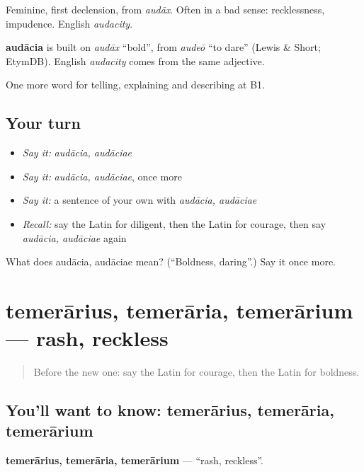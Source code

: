 Feminine, first declension, from \emph{audāx}. Often in a bad sense: recklessness, impudence. English \emph{audacity}.

\begin{cousinweb}
\textbf{audācia} is built on \emph{audāx} \textquotedblleft{}bold\textquotedblright{}, from \emph{audeō} \textquotedblleft{}to dare\textquotedblright{} (Lewis \& Short; EtymDB). English \emph{audacity} comes from the same adjective.
\end{cousinweb}

\begin{grammarlens}[title={What you've built}]
One more word for telling, explaining and describing at B1.
\end{grammarlens}

\subsection*{Your turn}
\begin{itemize}
\raggedright
  \item \emph{Say it:} \emph{audācia, audāciae}
  \item \emph{Say it:} \emph{audācia, audāciae}, once more
  \item \emph{Say it:} a sentence of your own with \emph{audācia, audāciae}
  \item \emph{Recall:} say the Latin for diligent, then the Latin for courage, then say \emph{audācia, audāciae} again
\end{itemize}

\begin{tcolorbox}[breakable,colback=teal!4,colframe=teal!35!black,title={Before you move on}]
What does audācia, audāciae mean? (\textquotedblleft{}Boldness, daring\textquotedblright{}.) Say it once more.
\end{tcolorbox}
\section[temerārius, temerāria, temerārium]{temerārius, temerāria, temerārium — rash, reckless}

\label{lesson:LA-C509-temerarius}



\begin{quote}
Before the new one: say the Latin for courage, then the Latin for boldness.
\end{quote}

\subsection*{You'll want to know: temerārius, temerāria, temerārium}
\textbf{temerārius, temerāria, temerārium} — \textquotedblleft{}rash, reckless\textquotedblright{}.

